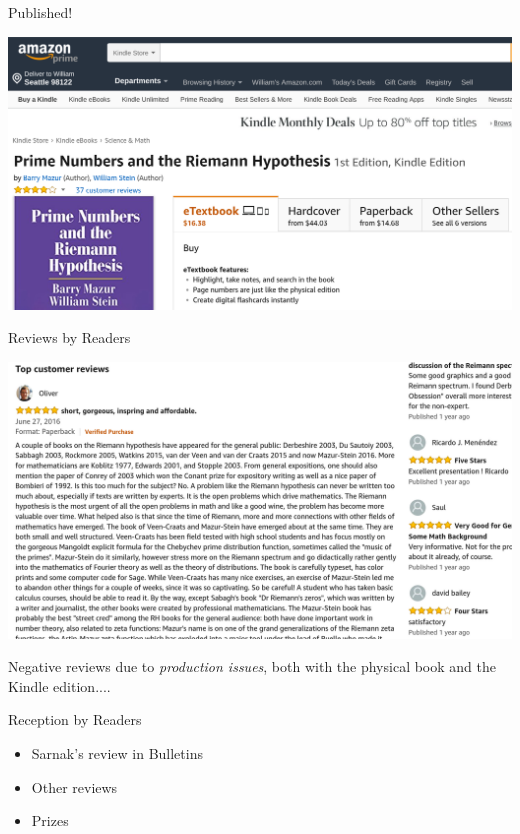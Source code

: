 \documentclass{beamer}
\begin{document}
\begin{frame}{Published!}

  \includegraphics[width=.98\textwidth]{pics/amazon-prime}

\end{frame}



\begin{frame}{Reviews by Readers}

  \includegraphics[width=.98\textwidth]{pics/amazon-review}

  \vfill

  Negative reviews  due to \textit{production issues}, both with the physical book
  and the Kindle edition....

\end{frame}

\begin{frame}{Reception by Readers}
  \begin{itemize}
    \item Sarnak's review in Bulletins
    \item Other reviews
    \item Prizes
  \end{itemize}
\end{frame}
\end{document}
